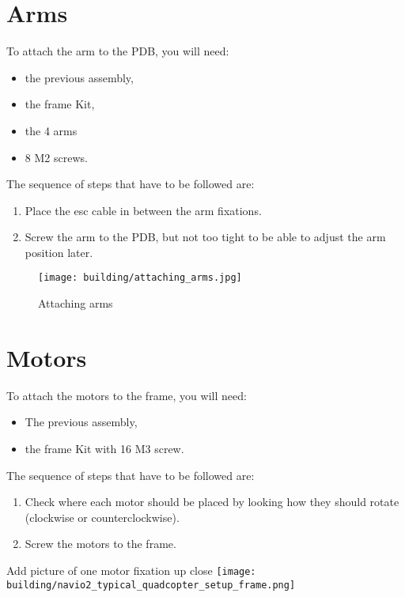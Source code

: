         
    \section{Arms}
        To attach the arm to the PDB, you will need:
        \begin{itemize}
            \item the previous assembly,
            \item the frame Kit, 
            \item the 4 arms 
            \item 8 M2 screws.
        \end{itemize}
        The sequence of steps that have to be followed are:
        \begin{enumerate}
            \item Place the esc cable in between the arm fixations.
            \item Screw the arm to the PDB, but not too tight to be able to adjust the arm position later.
        \end{enumerate}
        
        \begin{figure}[!ht]
            \centering
            \texttt{[image: building/attaching\_arms.jpg]}
            \caption{Attaching arms}
            \label{fig:arms}
        \end{figure}
        
        
        
        
    \section{Motors}
        To attach the motors to the frame, you will need:
        \begin{itemize}
            \item The previous assembly,
            \item the frame Kit with 16 M3 screw.
        \end{itemize}
        The sequence of steps that have to be followed are:
        \begin{enumerate}
            \item Check where each motor should be placed by looking how they should rotate (clockwise or counterclockwise).
            \item Screw the motors to the frame.
        \end{enumerate}
        
        {\color{blue} Add picture of one motor fixation up close}
        \texttt{[image: building/navio2\_typical\_quadcopter\_setup\_frame.png]}
        
